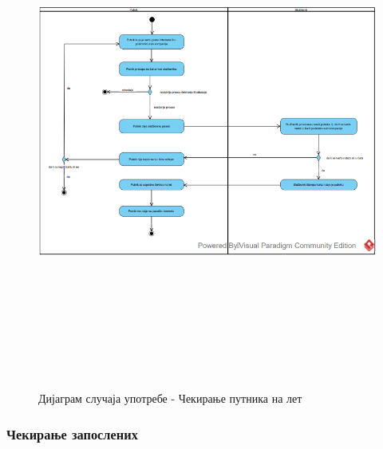 \documentclass{article}
\begin{document}
\begin{figure}[H]
    \centering
    \includegraphics[width=1.1\textwidth, height=17cm]{Dijagrami_slike/cekiranje_putnika.png}
    \caption{Дијаграм случаја употребе - Чекирање путника на лет}
\end{figure}

\newpage
\subsubsection{Чекирање запослених}
\end{document}

